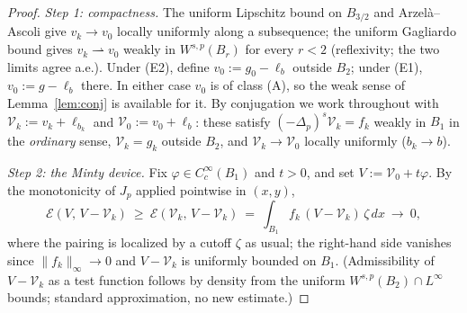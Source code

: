 \documentclass[11pt]{amsart}
\theoremstyle{plain}
\theoremstyle{definition}
\theoremstyle{remark}
\newcommand{\fpl}[1]{(-\Delta_p)^{s}#1}
\begin{document}
\begin{proof}
\emph{Step 1: compactness.} The uniform Lipschitz bound on $B_{3/2}$ and
Arzel\`a--Ascoli give $v_k\to v_0$ locally uniformly along a subsequence; the
uniform Gagliardo bound gives $v_k\rightharpoonup v_0$ weakly in
$W^{s,p}(B_r)$ for every $r<2$ \textnormal{(}reflexivity; the two limits
agree a.e.\textnormal{)}. Under (E2), define $v_0:=g_0-\ell_b$ outside $B_2$;
under (E1), $v_0:=g-\ell_b$ there. In either case $v_0$ is of class
\textnormal{(A)}, so the weak sense of Lemma~\ref{lem:conj} is available for
it. By conjugation we work throughout with
$\mathcal V_k:=v_k+\ell_{b_k}$ and $\mathcal V_0:=v_0+\ell_b$: these satisfy
$\fpl{\mathcal V_k}=f_k$ weakly in $B_1$ in the \emph{ordinary} sense,
$\mathcal V_k=g_k$ outside $B_2$, and $\mathcal V_k\to\mathcal V_0$ locally
uniformly \textnormal{(}$b_k\to b$\textnormal{)}.

\emph{Step 2: the Minty device.} Fix $\varphi\in C_c^\infty(B_1)$ and $t>0$,
and set $V:=\mathcal V_0+t\varphi$. By the monotonicity of $J_p$ applied
pointwise in $(x,y)$,
\begin{equation}\label{eq:minty}
  \mathcal E(V,\,V-\mathcal V_k)\ \ge\ \mathcal E(\mathcal V_k,\,V-\mathcal V_k)
  \ =\ \int_{B_1} f_k\,(V-\mathcal V_k)\,\zeta\,dx\ \longrightarrow\ 0,
\end{equation}
where the pairing is localized by a cutoff $\zeta$ as usual; the right-hand
side vanishes since $\|f_k\|_\infty\to0$ and $V-\mathcal V_k$ is uniformly
bounded on $B_1$. \textnormal{(}Admissibility of $V-\mathcal V_k$ as a test
function follows by density from the uniform $W^{s,p}(B_2)\cap L^\infty$
bounds; standard approximation, no new estimate.\textnormal{)}


\end{proof}
\end{document}
